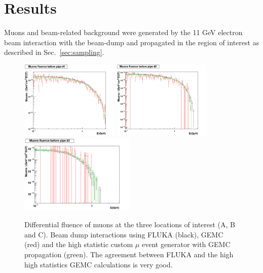 \section{Results}\label{sec:results}

Muons and beam-related background  were generated by the 11 GeV electron beam interaction with the beam-dump and propagated in the region of interest as described in  Sec.~\ref{sec:sampling}. 

\begin{figure}[h!] 
\center
\includegraphics[width=4.7cm]{figs/comparisonMuonsPipe1_1D.pdf}
\includegraphics[width=4.7cm]{figs/comparisonMuonsPipe2_1D.pdf}
\includegraphics[width=5.5cm]{figs/comparisonMuonsPipe3_1D.pdf}
\caption{Differential fluence of muons at the three locations of interest (A, B and C). Beam dump interactions using  FLUKA (black), GEMC (red) and the high statistic custom $\mu$ event generator with GEMC propagation (green). The agreement between FLUKA and the high high statistics GEMC calculations is very good.}
\label{fig:mu-comp}
\end{figure}


